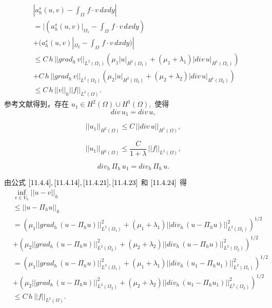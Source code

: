 \documentclass[a4paper,UTF8,titlepage,10pt]{ctexart}
\numberwithin{equation}{subsection}
\begin{document}
\begin{equation}
\begin{aligned}
	&|a_h^s(u,v) - \int_{\Omega} \, f \cdot v \, dxdy| \\
	&= |(a_h^s(u,v)|_{\Omega_1} - \int_{\Omega} \, f \cdot v \, dxdy) \\
	&+ (a_h^s(u,v)|_{\Omega_2} - \int_{\Omega} \, f \cdot v \, dxdy)|\\
	&\le C \, h \, ||grad_h \, v||_{L^2(\Omega_1)} (\mu_1 |u|_{H^2(\Omega_1)} + (\mu_1+\lambda_1) |div \, u|_{H^1(\Omega_1)}) \\
	&+ C \, h \, ||grad_h \, v||_{L^2(\Omega_2)} (\mu_2 |u|_{H^2(\Omega_2)} + (\mu_2+\lambda_2) |div \, u|_{H^1(\Omega_2)}) \\
	&\le C \, h \, ||v||_h ||f||_{L^2(\Omega)}. 
\end{aligned}
\label{11.4.20}
\end{equation}
参考文献得到，存在 $u_1 \in H^2(\Omega) \cup H^1(\Omega),$ 使得
\begin{equation}
	div \, u_1 = div \, u ,
	\label{11.4.21}
\end{equation}

\begin{equation}
	||u_1||_{H^2(\Omega)} \le C \, ||div \, u||_{H^1(\Omega)} ,
	\label{11.4.22}
\end{equation}

\begin{equation}
	||u_1||_{H^2(\Omega)} \le \frac{C}{1+\lambda} \, ||f||_{L^2(\Omega)} ,
	\label{11.4.23}
\end{equation}

\begin{equation}
	div_h \, \Pi_h \, u_1 = div_h \, \Pi_h \, u.
	\label{11.4.24}
\end{equation}

由公式 $\eqref{11.4.4}, \eqref{11.4.14}, \eqref{11.4.21}, \eqref{11.4.23}$ 和 $\eqref{11.4.24}$ 得
\begin{equation}
\begin{aligned}
	&\inf_{v \in V_h} ||u - v||_h \\
	&\le ||u - \Pi_h u||_h \\
	&= (\mu_1 ||grad_h \, (u-\Pi_h u)||_{L^2(\Omega_1)}^2 + (\mu_1+\lambda_1) ||div_h \, (u-\Pi_h u)||^2_{L^2(\Omega_1)})^{1/2} \\
	&+ (\mu_2 ||grad_h \, (u-\Pi_h u)||_{L^2(\Omega_2)}^2 + (\mu_2+\lambda_2) ||div_h \, (u-\Pi_h u)||^2_{L^2(\Omega_2)})^{1/2} \\
	&= (\mu_1 ||grad_h \, (u-\Pi_h u)||_{L^2(\Omega_1)}^2 + (\mu_1+\lambda_1) ||div_h \, (u_1-\Pi_h u_1)||^2_{L^2(\Omega_1)})^{1/2} \\
	&+ (\mu_2 ||grad_h \, (u-\Pi_h u)||_{L^2(\Omega_2)}^2 + (\mu_2+\lambda_2) ||div_h \, (u_1-\Pi_h u_1)||^2_{L^2(\Omega_2)})^{1/2} \\
	&\le C \, h \, ||f||_{L^2(\Omega)}.
\end{aligned}
\label{11.4.25}
\end{equation}
\end{document}
